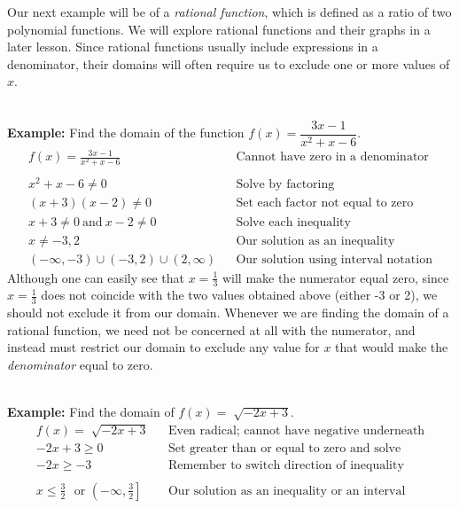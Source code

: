 \documentclass[12pt]{article}
\theoremstyle{definition}
\begin{document}
Our next example will be of a {\it rational function}, which is defined as a ratio of two polynomial functions.  We will explore rational functions and their graphs in a later lesson.  Since rational functions usually include expressions in a denominator, their domains will often require us to exclude one or more values of $x$.\\
\ \par
{\bf Example:} Find the domain of the function $f (x) = \dfrac{3 x - 1}{x^2 + x - 6}$.
  \begin{eqnarray*}
    f (x) = \frac{3 x - 1}{x^2 + x - 6}
    &  & \text{Cannot have zero in a denominator}\\
		& & \\
    x^2 + x - 6 \neq 0 &  & \text{Solve by factoring}\\
    (x + 3) (x - 2) \neq 0 &  & \text{Set each factor not equal to zero}\\
    x + 3 \neq 0 \ \text{and} \ x - 2 \neq 0 &  & \text{Solve each inequality}\\
    x \neq - 3, 2 &  & \text{Our solution as an inequality}\\
		(-\infty,-3)\cup(-3,2)\cup(2,\infty) & & \text{Our solution using interval notation}
  \end{eqnarray*}
Although one can easily see that $x=\frac{1}{3}$ will make the numerator equal zero, since $x=\frac{1}{3}$ does not coincide with the two values obtained above (either -3 or 2), we should not exclude it from our domain.  Whenever we are finding the domain of a rational function, we need not be concerned at all with the numerator, and instead must restrict our domain to exclude any value for $x$ that would make the {\it denominator} equal to zero.\\
\ \par
{\bf Example:} Find the domain of $f (x) = \sqrt[]{-2 x + 3}$.
  \begin{eqnarray*}
    f (x) = \sqrt[]{-2 x + 3} &  & \text{Even radical; cannot have negative underneath}\\
		-2 x + 3 \geq 0 &  & \text{Set greater than or equal to zero and solve}\\
    -2 x \geq -3 &  & \text{Remember to switch direction of inequality}\\
		& &\\
    x \leq \frac{3}{2} \text{~~or~} \left(-\infty,\frac{3}{2}\right]&  & \text{Our solution as an inequality or an interval}
  \end{eqnarray*}
\end{document}
